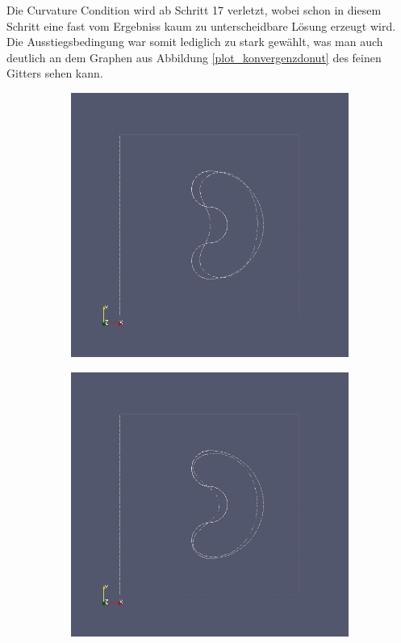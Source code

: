 Die Curvature Condition wird ab Schritt 17 verletzt, wobei schon in diesem Schritt eine fast vom Ergebniss kaum zu unterscheidbare Lösung erzeugt wird. Die Ausstiegsbedingung war somit lediglich zu stark gewählt, was man auch deutlich an dem Graphen aus Abbildung \ref{plot_konvergenzdonut} des feinen Gitters sehen kann. 

\begin{figure}
	\begin{subfigure}{0.5\textwidth}
	\centering
	\includegraphics[scale=0.25]{pic_brokendonut_bfgs_linesearch.jpg}
	\caption{}	
	\end{subfigure}
	\begin{subfigure}{0.5\textwidth}
	\centering
	\includegraphics[scale=0.25]{pic_brokendonut_bfgs_linesearch_fine.jpg}

\end{subfigure}
\end{figure}
